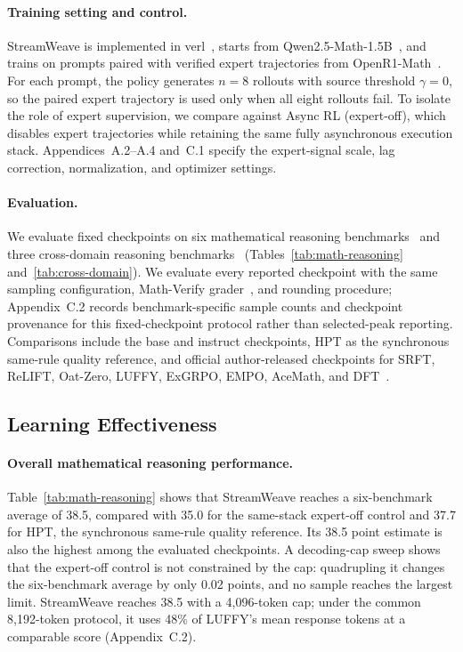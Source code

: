 \documentclass[letterpaper]{article}
\begin{document}
\paragraph{Training setting and control.}
StreamWeave is implemented in verl~\citep{sheng2025hybridflow}, starts from Qwen2.5-Math-1.5B~\citep{yang2024qwen25math}, and trains on prompts paired with verified expert trajectories from OpenR1-Math~\citep{huggingface2025openr1}.
For each prompt, the policy generates $n=8$ rollouts with source threshold $\gamma=0$, so the paired expert trajectory is used only when all eight rollouts fail.
To isolate the role of expert supervision, we compare against Async RL (expert-off), which disables expert trajectories while retaining the same fully asynchronous execution stack.
Appendices~A.2--A.4 and~C.1 specify the expert-signal scale, lag correction, normalization, and optimizer settings.

\paragraph{Evaluation.}
We evaluate fixed checkpoints on six mathematical reasoning benchmarks~\citep{hendrycks2021math,lightman2024prm800k,lewkowycz2022minerva,he2024olympiadbench} and three cross-domain reasoning benchmarks~\citep{clark2018arc,rein2024gpqa,wang2024mmlupro} (Tables~\ref{tab:math-reasoning} and~\ref{tab:cross-domain}).
We evaluate every reported checkpoint with the same sampling configuration, Math-Verify grader~\citep{kydlicek2025mathverify}, and rounding procedure; Appendix~C.2 records benchmark-specific sample counts and checkpoint provenance for this fixed-checkpoint protocol rather than selected-peak reporting.
Comparisons include the base and instruct checkpoints, HPT as the synchronous same-rule quality reference, and official author-released checkpoints for SRFT, ReLIFT, Oat-Zero, LUFFY, ExGRPO, EMPO, AceMath, and DFT~\citep{liu2025oatzero,yan2025luffy,fu2026srft,ma2026relift,zhan2026exgrpo,zhang2025empo,liu2025acemath,wu2026dft}.

\subsection{Learning Effectiveness}
\label{sec:learning-effectiveness}

\paragraph{Overall mathematical reasoning performance.}
Table~\ref{tab:math-reasoning} shows that StreamWeave reaches a six-benchmark average of 38.5, compared with 35.0 for the same-stack expert-off control and 37.7 for HPT, the synchronous same-rule quality reference.
Its 38.5 point estimate is also the highest among the evaluated checkpoints.
A decoding-cap sweep shows that the expert-off control is not constrained by the cap: quadrupling it changes the six-benchmark average by only 0.02 points, and no sample reaches the largest limit.
StreamWeave reaches 38.5 with a 4,096-token cap; under the common 8,192-token protocol, it uses 48\% of LUFFY's mean response tokens at a comparable score (Appendix~C.2).
\end{document}

